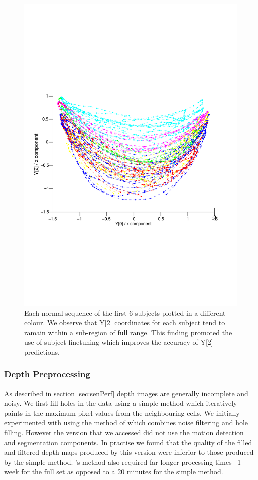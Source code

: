 \documentclass[11pt]{article} %
\begin{document}
\begin{figure}
\centering
\includegraphics*[trim={0 5cm 0 7cm},clip,width=0.75\linewidth,clip]{subjectsOnManifold.pdf} 
\caption{Each normal sequence of the first 6 subjects plotted in a different colour. We observe that Y[2] coordinates for each subject tend to ramain within a sub-region of full range. This finding promoted the use of subject finetuning which improves the accuracy of Y[2] predictions. }
\label{fig:subjectsOnManifold}
\end{figure}













\subsubsection{Depth Preprocessing}

As described in section \ref{sec:senPerf} depth images are generally incomplete and noisy. We first fill holes in the data using a simple method which iteratively paints in the maximum pixel values from the neighbouring cells. We initially experimented with using the method of \cite{Camplani2012a} which combines noise filtering and hole filling. However the version that we accessed did not use the motion detection and segmentation components. In practise we found that the quality of the filled and filtered depth maps produced by this version were inferior to those produced by the simple method.  \cite{Camplani2012a}'s method also required far longer processing times ~1 week for the full set as opposed to a 20 minutes for the simple method. 
\end{document}
